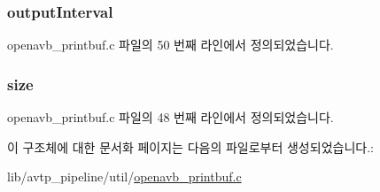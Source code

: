 \subsubsection[{\texorpdfstring{output\+Interval}{outputInterval}}]{ output\+Interval}\hypertarget{structopenavb__printbuf_ad5c88a8a57653f0cd93e5d01b9a2700f}{}\label{structopenavb__printbuf_ad5c88a8a57653f0cd93e5d01b9a2700f}


openavb\+\_\+printbuf.\+c 파일의 50 번째 라인에서 정의되었습니다.

\subsubsection[{\texorpdfstring{size}{size}}]{ size}\hypertarget{structopenavb__printbuf_a48d1688d27e52f04e303777351a4779a}{}\label{structopenavb__printbuf_a48d1688d27e52f04e303777351a4779a}


openavb\+\_\+printbuf.\+c 파일의 48 번째 라인에서 정의되었습니다.



이 구조체에 대한 문서화 페이지는 다음의 파일로부터 생성되었습니다.\+:\begin{DoxyCompactItemize}
\item 
lib/avtp\+\_\+pipeline/util/\hyperlink{openavb__printbuf_8c}{openavb\+\_\+printbuf.\+c}\end{DoxyCompactItemize}

